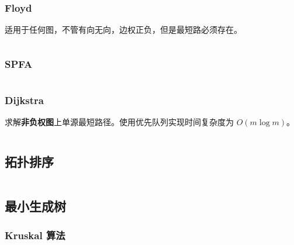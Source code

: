 \documentclass[a4paper, twoside]{article}
\begin{document}
    \subsubsection{Floyd}
    适用于任何图，不管有向无向，边权正负，但是最短路必须存在。
    \inputminted{cpp}{../src/图论/Floyd.cpp}

    \subsubsection{SPFA}
    \inputminted{cpp}{../src/图论/SPFA.cpp}

    \subsubsection{Dijkstra}
    求解\textbf{非负权图}上单源最短路径。使用优先队列实现时间复杂度为 $O(m \log m)$。
    \inputminted{cpp}{../src/图论/Dijkstra.cpp}


\subsection{拓扑排序}
    \inputminted{cpp}{../src/图论/拓扑排序.cpp}

\subsection{最小生成树}

    \subsubsection{Kruskal 算法}
    \inputminted{cpp}{../src/图论/Kruskal.cpp}



\end{document}
